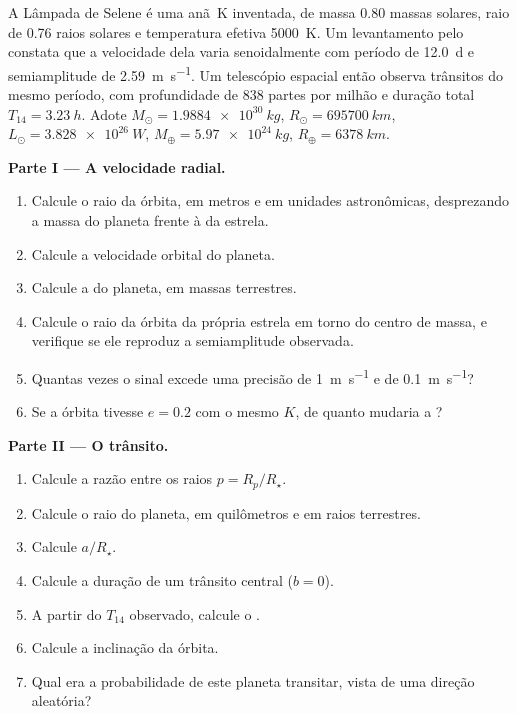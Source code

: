 \begin{problem}
\label{pb:b3:exoplanets:1}
A Lâmpada de Selene é uma anã~K inventada, de massa 0.80 massas solares, raio
de 0.76 raios solares e temperatura efetiva \qty{5000}{K}. Um
levantamento pelo  constata que a velocidade dela varia senoidalmente
com período de \qty{12.0}{d} e semiamplitude de \qty{2.59}{m.s^{-1}}. Um
telescópio espacial então observa trânsitos do mesmo período, com profundidade
de \num{838} partes por milhão e duração total $T_{14} = \qty{3.23}{h}$.
Adote $M_\odot = \qty{1.9884e30}{kg}$, $R_\odot = \qty{695700}{km}$,
$L_\odot = \qty{3.828e26}{W}$, $M_\oplus = \qty{5.97e24}{kg}$,
$R_\oplus = \qty{6378}{km}$.

\medskip\noindent\textbf{Parte I --- A velocidade radial.}
\begin{enumerate}
\item Calcule o raio da órbita, em metros e em unidades astronômicas,
  desprezando a massa do planeta frente à da estrela.
\item Calcule a velocidade orbital do planeta.
\item Calcule a  do planeta, em massas terrestres.
\item Calcule o raio da órbita da própria estrela em torno do centro de
  massa, e verifique se ele reproduz a semiamplitude observada.
\item Quantas vezes o sinal excede uma precisão de
  \qty{1}{m.s^{-1}} e de \qty{0.1}{m.s^{-1}}?
\item Se a órbita tivesse $e = 0.2$ com o mesmo $K$, de quanto mudaria a
  ?
\end{enumerate}

\medskip\noindent\textbf{Parte II --- O trânsito.}
\begin{enumerate}[resume]
\item Calcule a razão entre os raios $p = R_p/R_\star$.
\item Calcule o raio do planeta, em quilômetros e em raios terrestres.
\item Calcule $a/R_\star$.
\item Calcule a duração de um trânsito central ($b = 0$).
\item A partir do $T_{14}$ observado, calcule o .
\item Calcule a inclinação da órbita.
\item Qual era a probabilidade de este planeta transitar, vista de uma
  direção aleatória?
\end{enumerate}


\end{problem}
